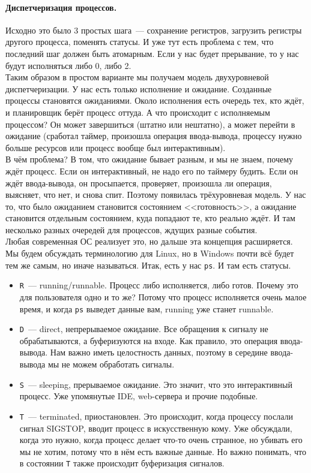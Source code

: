 \documentclass{article}
\begin{document}
    \paragraph{Диспетчеризация процессов.}
    Исходно это было 3 простых шага~--- сохранение регистров, загрузить регистры другого процесса, поменять статусы. И уже тут есть проблема с тем, что последний шаг должен быть атомарным. Если у нас будет прерывание, то у нас будут исполняться либо 0, либо 2.\\
    Таким образом в простом варианте мы получаем модель двухуровневой диспетчеризации. У нас есть только исполнение и ожидание. Созданные процессы становятся ожиданиями. Около исполнения есть очередь тех, кто ждёт, и планировщик берёт процесс оттуда. А что происходит с исполняемым процессом? Он может завершиться (штатно или нештатно), а может перейти в ожидание (сработал таймер, произошла операция ввода-вывода, процессу нужно больше ресурсов или процесс вообще был интерактивным).\\
    В чём проблема? В том, что ожидание бывает разным, и мы не знаем, почему ждёт процесс. Если он интерактивный, не надо его по таймеру будить. Если он ждёт ввода-вывода, он просыпается, проверяет, произошла ли операция, выясняет, что нет, и снова спит. Поэтому появилась трёхуровневая модель. У нас то, что было ожиданием становится состоянием <<готовность>>, а ожидание становится отдельным состоянием, куда попадают те, кто реально ждёт. И там несколько разных очередей для процессов, ждущих разные события.\\
    Любая современная ОС реализует это, но дальше эта концепция расширяется. Мы будем обсуждать терминологию для Linux, но в Windows почти всё будет тем же самым, но иначе называться. Итак, есть у нас \texttt{ps}. И там есть статусы.
    \begin{itemize}
        \item \texttt{R}~--- running/runnable. Процесс либо исполняется, либо готов. Почему это для пользователя одно и то же? Потому что процесс исполняется очень малое время, и когда \texttt{ps} выведет данные вам, running уже станет runnable.
        \item \texttt{D}~--- direct, непрерываемое ожидание. Все обращения к сигналу не обрабатываются, а буферизуются на входе. Как правило, это операция ввода-вывода. Нам важно иметь целостность данных, поэтому в середине ввода-вывода мы не можем обработать сигналы.
        \item \texttt{S}~--- sleeping, прерываемое ожидание. Это значит, что это интерактивный процесс. Уже упомянутые IDE, web-сервера и прочие подобные.
        \item \texttt{T}~--- terminated, приостановлен. Это происходит, когда процессу послали сигнал SIGSTOP, вводит процесс в искусственную кому. Уже обсуждали, когда это нужно, когда процесс делает что-то очень странное, но убивать его мы не хотим, потому что в нём есть важные данные. Но важно понимать, что в состоянии \texttt{T} также происходит буферизация сигналов.
    \end{itemize}
\end{document}
